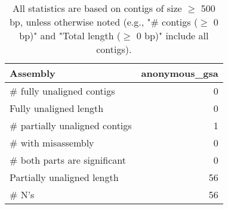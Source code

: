 \documentclass[12pt,a4paper]{article}
\begin{document}
\begin{table}[ht]
\begin{center}
\caption{All statistics are based on contigs of size $\geq$ 500 bp, unless otherwise noted (e.g., "\# contigs ($\geq$ 0 bp)" and "Total length ($\geq$ 0 bp)" include all contigs).}
\begin{tabular}{|l*{1}{|r}|}
\hline
Assembly & anonymous\_gsa \\ \hline
\# fully unaligned contigs & 0 \\ \hline
Fully unaligned length & 0 \\ \hline
\# partially unaligned contigs & 1 \\ \hline
\hspace{5mm}\# with misassembly & 0 \\ \hline
\hspace{5mm}\# both parts are significant & 0 \\ \hline
Partially unaligned length & 56 \\ \hline
\# N's & 56 \\ \hline
\end{tabular}
\end{center}
\end{table}
\end{document}
